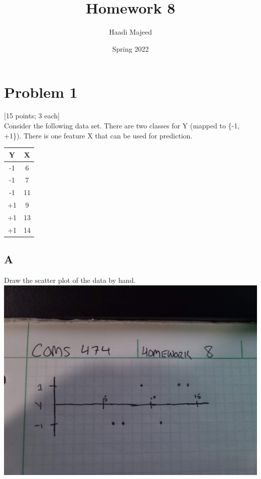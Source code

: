 \documentclass[12pt]{article}
\title{ \course \\\large Homework 8 }
\author{ Haadi Majeed }
\date{Spring 2022}
\begin{document}
\maketitle
\pagebreak

\pagebreak
\section{Problem 1}
 [15 points; 3 each]\\
Consider the following data set. There are two classes for
Y (mapped to \{-1, +1\}). There is one feature X that can be used for prediction.
\begin{center}
    \begin{tabular}{ |c|c| }
        \hline
        Y  & X  \\
        \hline
        -1 & 6  \\
        \hline
        -1 & 7  \\
        \hline
        -1 & 11 \\
        \hline
        +1 & 9  \\
        \hline
        +1 & 13 \\
        \hline
        +1 & 14 \\
        \hline
    \end{tabular}
\end{center}
\subsection{A}
Draw the scatter plot of the data by hand.\\
\includegraphics[width=1\textwidth]{p1.a.jpg}
\end{document}
